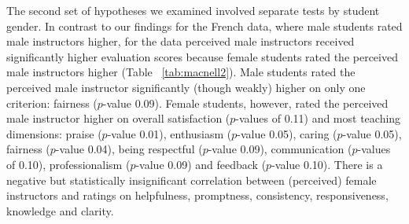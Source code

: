 \documentclass[12pt]{article}
\begin{document}
The second set of hypotheses we examined involved separate tests by student gender.
In contrast to our findings for the French data, where male students rated male instructors higher, 
for the \citet{MacNell2014} data perceived male instructors received significantly higher evaluation scores because female students rated the perceived male instructors higher 
(Table ~\ref{tab:macnell2}). 
Male students rated the perceived male instructor significantly (though weakly) higher on only one criterion: fairness ($p$-value 0.09). 
Female students, however, rated the perceived male instructor higher on overall satisfaction ($p$-values of 0.11) and most teaching dimensions: praise ($p$-value 0.01), enthusiasm ($p$-value 0.05), caring ($p$-value 0.05), fairness ($p$-value 0.04), being respectful ($p$-value 0.09),  communication ($p$-values of 0.10), 
professionalism ($p$-value 0.09) and feedback ($p$-value 0.10). 
There is a negative but statistically insignificant correlation between (perceived) 
female instructors
and ratings on helpfulness, promptness, consistency, responsiveness, knowledge and clarity.
\end{document}
